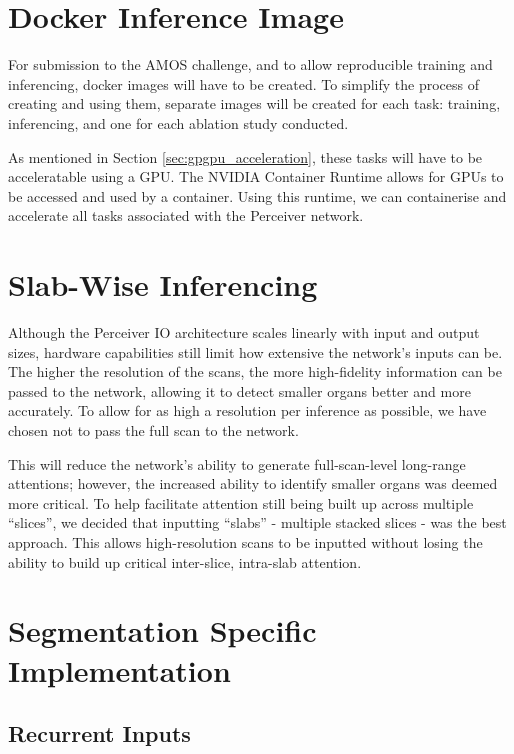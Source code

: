\documentclass{l4proj}
\begin{document}
\section{Docker Inference Image}

For submission to the AMOS challenge, and to allow reproducible training and inferencing, docker images will have to be created. To simplify the process of creating and using them, separate images will be created for each task: training, inferencing, and one for each ablation study conducted.

As mentioned in Section \ref{sec:gpgpu_acceleration}, these tasks will have to be acceleratable using a GPU. The NVIDIA Container Runtime allows for GPUs to be accessed and used by a container. Using this runtime, we can containerise and accelerate all tasks associated with the Perceiver network.

\section{Slab-Wise Inferencing}

Although the Perceiver IO architecture scales linearly with input and output sizes, hardware capabilities still limit how extensive the network’s inputs can be. The higher the resolution of the scans, the more high-fidelity information can be passed to the network, allowing it to detect smaller organs better and more accurately. To allow for as high a resolution per inference as possible, we have chosen not to pass the full scan to the network.

This will reduce the network’s ability to generate full-scan-level long-range attentions; however, the increased ability to identify smaller organs was deemed more critical. To help facilitate attention still being built up across multiple “slices”, we decided that inputting “slabs” - multiple stacked slices - was the best approach. This allows high-resolution scans to be inputted without losing the ability to build up critical inter-slice, intra-slab attention.

\section{Segmentation Specific Implementation}

\subsection{Recurrent Inputs}
\end{document}
